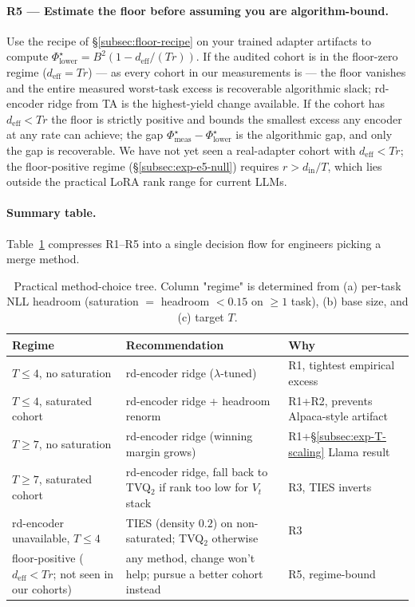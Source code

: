 \paragraph{R5 --- Estimate the floor before assuming you are
algorithm-bound.}
Use the recipe of \S\ref{subsec:floor-recipe} on your trained adapter
artifacts to compute $\Phi^\star_{\mathrm{lower}} = B^2 (1 -
d_{\mathrm{eff}} / (Tr))$. If the audited cohort is in the floor-zero
regime ($d_{\mathrm{eff}} = Tr$) --- as every cohort in our
measurements is --- the floor vanishes and the entire measured
worst-task excess is recoverable algorithmic slack; rd-encoder ridge
from TA is the highest-yield change available. If the cohort has
$d_{\mathrm{eff}} < Tr$ the floor is strictly positive and bounds the
smallest excess any encoder at any rate can achieve; the gap
$\Phi^\star_{\mathrm{meas}} - \Phi^\star_{\mathrm{lower}}$ is the
algorithmic gap, and only the gap is recoverable. We have not yet
seen a real-adapter cohort with $d_{\mathrm{eff}} < Tr$; the
floor-positive regime (\S\ref{subsec:exp-e5-null}) requires
$r > d_{\mathrm{in}} / T$, which lies outside the practical LoRA rank
range for current
LLMs.

\paragraph{Summary table.}
Table~\ref{tab:practical-tree} compresses R1--R5 into a single
decision flow for engineers picking a merge method.

\begin{table}[t]
\centering
\caption{Practical method-choice tree. Column "regime" is determined
from (a) per-task NLL headroom (saturation $=$ headroom $< 0.15$ on
$\geq 1$ task), (b) base size, and (c) target $T$.}
\label{tab:practical-tree}
\small
\begin{tabular}{lll}
\hline
Regime & Recommendation & Why \\
\hline
$T \leq 4$, no saturation        & rd-encoder ridge ($\lambda$-tuned)   & R1, tightest empirical excess \\
$T \leq 4$, saturated cohort     & rd-encoder ridge + headroom renorm    & R1+R2, prevents Alpaca-style artifact \\
$T \geq 7$, no saturation        & rd-encoder ridge (winning margin grows) & R1+\S\ref{subsec:exp-T-scaling} Llama result \\
$T \geq 7$, saturated cohort     & rd-encoder ridge, fall back to TVQ$_2$ if rank too low for $V_t$ stack & R3, TIES inverts \\
rd-encoder unavailable, $T \leq 4$ & TIES (density $0.2$) on non-saturated; TVQ$_2$ otherwise & R3 \\
floor-positive ($d_{\mathrm{eff}} < Tr$; not seen in our cohorts) & any method, change won't help; pursue a better cohort instead & R5, regime-bound \\
\hline
\end{tabular}
\end{table}

